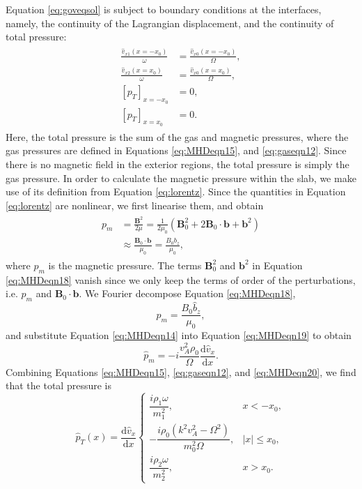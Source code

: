 Equation \eqref{eq:goveqsol} is subject to boundary conditions at the interfaces, namely, the continuity of the Lagrangian displacement, and the continuity of total pressure:
\begin{align}
\begin{split}
\label{eq:bcs}
\frac{\hat v_{x1} (x = - x_0)}{\omega}
& = \frac{\hat v_{x0} (x = - x_0)}{\Omega},
\\[0.3cm]
\frac{\hat v_{x2} (x = x_0)}{\omega}
& = \frac{\hat v_{x0} (x = x_0)}{\Omega},
\\[0.3cm]
[p_T]_{x = -x_0}
& = 0,
\\[0.3cm]
[p_T]_{x = x_0} 
& = 0.
\end{split}
\end{align}
Here, the total pressure is the sum of the gas and magnetic pressures, where the gas pressures are defined in Equations \eqref{eq:MHDeqn15}, and \eqref{eq:gaseqn12}.
Since there is no magnetic field in the exterior regions, the total pressure is simply the gas pressure.
In order to calculate the magnetic pressure within the slab, we make use of its definition from Equation \eqref{eq:lorentz}.
Since the quantities in Equation \eqref{eq:lorentz} are nonlinear, we first linearise them, and obtain
%
\begin{align}
\begin{split}
\label{eq:MHDeqn18}
p_m & = \frac{\mathbf{B}^2}{2 \mu}
= \frac{1}{2 \mu_0} ( \mathbf{B}_0^2 + 2 \mathbf{B}_0 \cdot \mathbf{b} + \mathbf{b}^2 )
\\[0.3cm]
& \approx \frac{\mathbf{B}_0 \cdot \mathbf{b}}{\mu_0}
= \frac{B_0 b_z}{\mu_0},
\end{split}
\end{align}
%
where $p_m$ is the magnetic pressure.
The terms $\mathbf{B}_0^2$ and $\mathbf{b}^2$ in Equation \eqref{eq:MHDeqn18} vanish since we only keep the terms of order of the perturbations, i.e. $p_m$ and $\mathbf{B}_0 \cdot \mathbf{b}$.
We Fourier decompose Equation \eqref{eq:MHDeqn18},
%
\begin{equation}
\label{eq:MHDeqn19}
\hat p_m = \frac{B_0 \hat b_z}{\mu_0},
\end{equation}
%
and substitute Equation \eqref{eq:MHDeqn14} into Equation \eqref{eq:MHDeqn19} to obtain
%
\begin{equation}
\label{eq:MHDeqn20}
\hat p_m = - i \frac{v_A^2 \rho_0}{\Omega} \frac{\mathrm{d} \hat v_x}{\mathrm{d} x}.
\end{equation}
Combining Equations \eqref{eq:MHDeqn15}, \eqref{eq:gaseqn12}, and \eqref{eq:MHDeqn20}, we find that the total pressure is
\begin{equation}
\label{eq:totalpres}
\hat p_{T} (x) = \frac{\mathrm{d} \hat v_x}{\mathrm{d} x}
\begin{cases}
\dfrac{i \rho_1 \omega}{m_1^2},    & x < - x_0,
\\[0.3cm]
-\dfrac{i \rho_0 (k^2 v_A^2 - \Omega^2)}{m_0^2 \Omega},  & |x| \leq x_0,
\\[0.3cm]
\dfrac{i \rho_2 \omega}{m_2^2},    & x > x_0.
\end{cases}
\end{equation}

